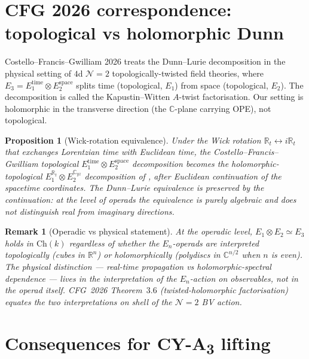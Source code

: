 \documentclass[11pt]{article}
\newtheorem{proposition}[theorem]{Proposition}
\newtheorem{remark}[theorem]{Remark}
\newcommand{\R}{\mathbb{R}}
\newcommand{\C}{\mathbb{C}}
\newcommand{\cN}{\mathcal{N}}
\begin{document}
\section{CFG 2026 correspondence: topological vs holomorphic Dunn}
\label{sec:cfg-correspondence}

Costello--Francis--Gwilliam 2026 treats the Dunn--Lurie decomposition in
the physical setting of $4$d $\cN = 2$ topologically-twisted field
theories, where $E_{3} = E_{1}^{\mathrm{time}} \otimes
E_{2}^{\mathrm{space}}$ splits time (topological, $E_{1}$) from space
(topological, $E_{2}$). The decomposition is called the
Kapustin--Witten $A$-twist factorisation. Our setting is holomorphic in
the transverse direction (the $\C$-plane carrying OPE), not topological.

\begin{proposition}[Wick-rotation equivalence]
\label{prop:wick-rotation}
Under the Wick rotation $\R_{t} \leftrightarrow i\R_{t}$ that exchanges
Lorentzian time with Euclidean time, the Costello--Francis--Gwilliam
topological $E_{1}^{\mathrm{time}} \otimes E_{2}^{\mathrm{space}}$
decomposition becomes the holomorphic-topological
$E_{1}^{\R_{t}} \otimes E_{2}^{\C_{yz}}$ decomposition of
, after Euclidean
continuation of the spacetime coordinates. The Dunn--Lurie equivalence
is preserved by the continuation: at the level of operads the
equivalence is purely algebraic and does not distinguish real from
imaginary directions.
\end{proposition}

\begin{remark}[Operadic vs physical statement]
At the operadic level, $E_{1} \otimes E_{2} \simeq E_{3}$ holds in
$\mathrm{Ch}(k)$ regardless of whether the $E_{n}$-operads are
interpreted topologically (cubes in $\R^{n}$) or holomorphically
(polydiscs in $\C^{n/2}$ when $n$ is even). The physical distinction ---
real-time propagation vs holomorphic-spectral dependence --- lives in
the \emph{interpretation} of the $E_{n}$-action on observables, not in
the operad itself. CFG~2026 Theorem~$3.6$ (twisted-holomorphic
factorisation) equates the two interpretations on shell of the
$\cN = 2$ BV action.
\end{remark}

\section{Consequences for CY-A\textsubscript{3} lifting}
\label{sec:cya3-lifting}
\end{document}
